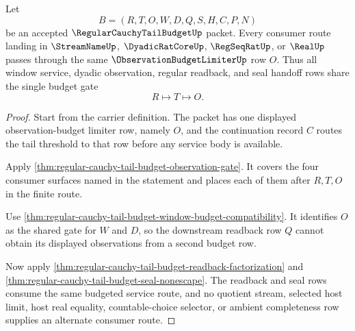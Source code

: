 \begin{theorem}
\label{thm:regular-cauchy-tail-budget-observation-budget-gate-totality}
Let
$$
B=(R,T,O,W,D,Q,S,H,C,P,N)
$$
be an accepted $\RegularCauchyTailBudgetUp$ packet. Every consumer route landing in $\StreamNameUp$, $\DyadicRatCoreUp$, $\RegSeqRatUp$, or $\RealUp$ passes through the same $\ObservationBudgetLimiterUp$ row $O$. Thus all window service, dyadic observation, regular readback, and seal handoff rows share the single budget gate
$$
R \longmapsto T \longmapsto O.
$$
\end{theorem}
\begin{proof}
Start from the carrier definition. The packet has one displayed observation-budget limiter row, namely $O$, and the continuation record $C$ routes the tail threshold to that row before any service body is available.

Apply \autoref{thm:regular-cauchy-tail-budget-observation-gate}. It covers the four consumer surfaces named in the statement and places each of them after $R,T,O$ in the finite route.

Use \autoref{thm:regular-cauchy-tail-budget-window-budget-compatibility}. It identifies $O$ as the shared gate for $W$ and $D$, so the downstream readback row $Q$ cannot obtain its displayed observations from a second budget row.

Now apply \autoref{thm:regular-cauchy-tail-budget-readback-factorization} and \autoref{thm:regular-cauchy-tail-budget-seal-nonescape}. The readback and seal rows consume the same budgeted service route, and no quotient stream, selected host limit, host real equality, countable-choice selector, or ambient completeness row supplies an alternate consumer route.
\end{proof}

